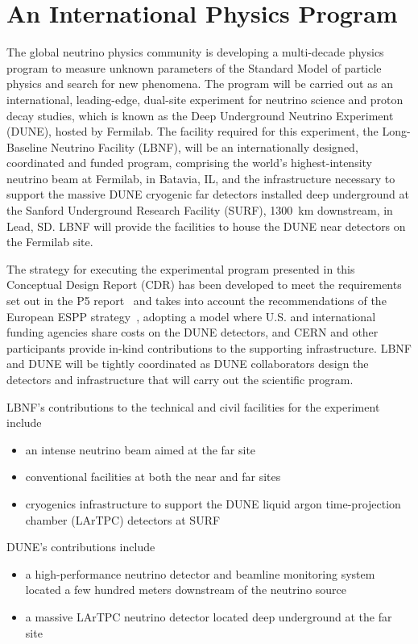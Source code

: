 
\section{An International Physics Program}

The global neutrino physics community is developing a multi-decade
physics program to measure unknown parameters of the Standard Model of
particle physics and search for new phenomena.  The program will be carried out as an international,
leading-edge, dual-site experiment for neutrino science and proton decay studies, which 
is known as the Deep Underground Neutrino Experiment (DUNE), hosted by Fermilab.  
The facility required for this experiment, the Long-Baseline Neutrino
Facility (LBNF), will be an internationally designed, coordinated and
funded program, comprising the world's highest-intensity neutrino beam
at Fermilab, in Batavia, IL, and the infrastructure necessary to support the massive
DUNE cryogenic far detectors installed deep underground at the Sanford
Underground Research Facility (SURF), \SI{1300}{\km} downstream,
in Lead, SD. LBNF will provide the facilities to house the DUNE near
detectors on the Fermilab site. 

The strategy for executing the experimental program presented in this Conceptual 
Design Report (CDR) has been developed to meet the requirements 
set out in the P5 report~\cite{p5report} and takes into account the recommendations of the European 
ESPP strategy~\cite{ESPP-2012}, adopting a model where U.S. and international funding agencies 
share costs on the DUNE detectors, and CERN and other participants provide in-kind contributions 
to the supporting infrastructure. LBNF and DUNE will be tightly coordinated as DUNE collaborators 
design the detectors and infrastructure that will carry out the scientific program.
  
LBNF's contributions to the technical and civil facilities for the experiment include
\begin{itemize}
\item an intense neutrino beam aimed at the far site
\item conventional facilities at both the near and far sites
\item cryogenics infrastructure to support the DUNE
  liquid argon time-projection chamber (LArTPC) detectors at SURF
\end{itemize}

DUNE's contributions include
\begin{itemize}
\item a high-performance neutrino detector and beamline monitoring system
located a few hundred meters downstream of the neutrino source
\item a massive LArTPC neutrino detector located deep underground at the far site
\end{itemize}

